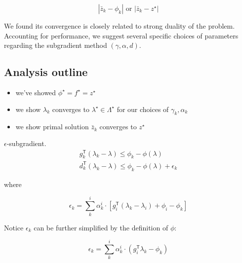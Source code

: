 \documentclass[../main]{subfiles}
\begin{document}
\[
  |\bar z_k - \phi_k| \textrm { or } |\bar z_k - z^\star|
\]

We found its convergence is closely related to strong duality of the problem. Accounting for performance,
we suggest several specific choices of parameters regarding the subgradient method \((\gamma, \alpha, d)\).


\subsection{Analysis outline}\label{analysis-outline}

\begin{itemize}

  \item
        we've showed \(\phi^\star = f^\star= z^\star\)
  \item
        we show \(\lambda_k\) converges to \(\lambda^\star \in \Lambda^\star\)
        for our choices of \(\gamma_k, \alpha_k\)
  \item
        we show primal solution \(\bar z_k\) converges to \(z^\star\)
\end{itemize}

\begin{lemma}\(\epsilon\)-subgradient.
  \begin{equation}\label{eq:subgrad}
    \begin{aligned}
      g_{k}^\mathsf{T}(\lambda_{k}  -\lambda) \le \phi_{k} - \phi(\lambda) \\
      d_{k}^\mathsf{T}(\lambda_{k}  -\lambda) \le \phi_{k} - \phi(\lambda) + \epsilon_k
    \end{aligned}
  \end{equation}
\end{lemma}

where

\begin{equation}\label{eq:def_eps}
  \epsilon_k = \sum^i_k \alpha^i_k \cdot \left [g_i^\mathsf{T}(\lambda_k - \lambda_i) + \phi_i - \phi_k \right ]
\end{equation}

Notice \(\epsilon_k\) can be further simplified by the definition of
\(\phi\):

\begin{equation}\label{eq:def_eps_simple}
  \epsilon_k = \sum^i_k \alpha^i_k \cdot \left ( g_i^\mathsf{T}\lambda_k  - \phi_k \right )
\end{equation}
\end{document}
